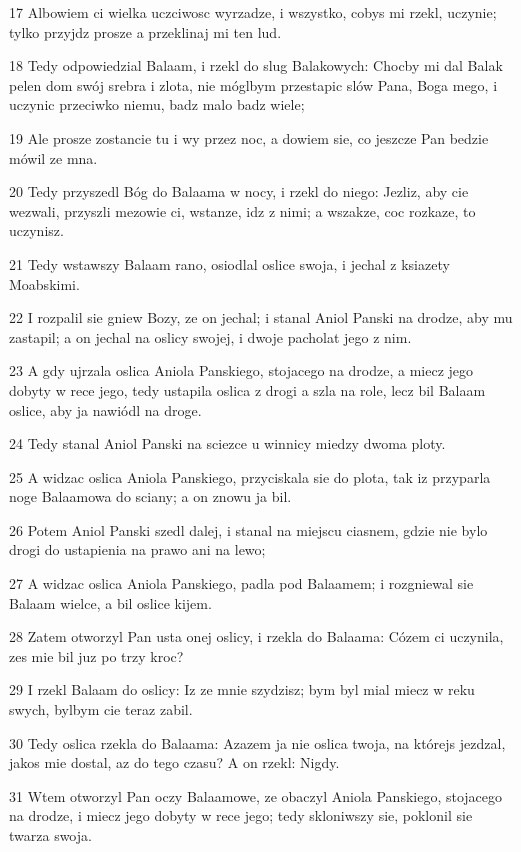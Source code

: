 \par 17 Albowiem ci wielka uczciwosc wyrzadze, i wszystko, cobys mi rzekl, uczynie; tylko przyjdz prosze a przeklinaj mi ten lud.
\par 18 Tedy odpowiedzial Balaam, i rzekl do slug Balakowych: Chocby mi dal Balak pelen dom swój srebra i zlota, nie móglbym przestapic slów Pana, Boga mego, i uczynic przeciwko niemu, badz malo badz wiele;
\par 19 Ale prosze zostancie tu i wy przez noc, a dowiem sie, co jeszcze Pan bedzie mówil ze mna.
\par 20 Tedy przyszedl Bóg do Balaama w nocy, i rzekl do niego: Jezliz, aby cie wezwali, przyszli mezowie ci, wstanze, idz z nimi; a wszakze, coc rozkaze, to uczynisz.
\par 21 Tedy wstawszy Balaam rano, osiodlal oslice swoja, i jechal z ksiazety Moabskimi.
\par 22 I rozpalil sie gniew Bozy, ze on jechal; i stanal Aniol Panski na drodze, aby mu zastapil; a on jechal na oslicy swojej, i dwoje pacholat jego z nim.
\par 23 A gdy ujrzala oslica Aniola Panskiego, stojacego na drodze, a miecz jego dobyty w rece jego, tedy ustapila oslica z drogi a szla na role, lecz bil Balaam oslice, aby ja nawiódl na droge.
\par 24 Tedy stanal Aniol Panski na sciezce u winnicy miedzy dwoma ploty.
\par 25 A widzac oslica Aniola Panskiego, przyciskala sie do plota, tak iz przyparla noge Balaamowa do sciany; a on znowu ja bil.
\par 26 Potem Aniol Panski szedl dalej, i stanal na miejscu ciasnem, gdzie nie bylo drogi do ustapienia na prawo ani na lewo;
\par 27 A widzac oslica Aniola Panskiego, padla pod Balaamem; i rozgniewal sie Balaam wielce, a bil oslice kijem.
\par 28 Zatem otworzyl Pan usta onej oslicy, i rzekla do Balaama: Cózem ci uczynila, zes mie bil juz po trzy kroc?
\par 29 I rzekl Balaam do oslicy: Iz ze mnie szydzisz; bym byl mial miecz w reku swych, bylbym cie teraz zabil.
\par 30 Tedy oslica rzekla do Balaama: Azazem ja nie oslica twoja, na którejs jezdzal, jakos mie dostal, az do tego czasu? A on rzekl: Nigdy.
\par 31 Wtem otworzyl Pan oczy Balaamowe, ze obaczyl Aniola Panskiego, stojacego na drodze, i miecz jego dobyty w rece jego; tedy skloniwszy sie, poklonil sie twarza swoja.
